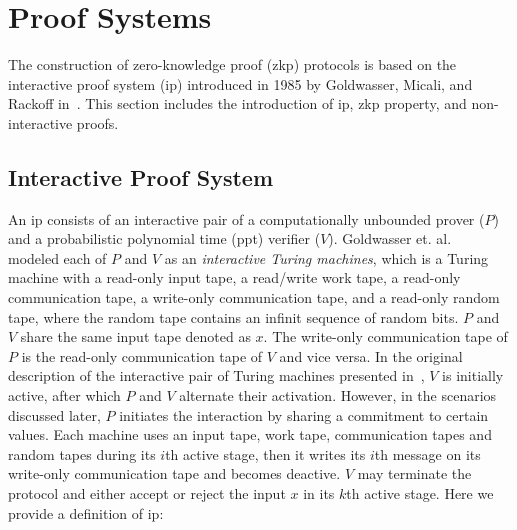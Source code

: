 \section{Proof Systems}

The construction of zero-knowledge proof (\gls{zkp}) protocols is based on the interactive proof system (\gls{ip}) introduced in 1985 by Goldwasser, Micali, and Rackoff in~\cite{Goldwasser1985}.  This section includes the introduction of \gls{ip}, \gls{zkp} property, and non-interactive proofs. 

\subsection{Interactive Proof System}\label{sec:Prel_IP}

 An \gls{ip} consists of  an interactive pair of a computationally unbounded prover ($P$) and a probabilistic polynomial time (\gls{ppt})  verifier ($V$).  Goldwasser et. al.~\cite{Goldwasser1985} modeled each of $P$ and $V$ as an \textit{interactive Turing machines}, which is a Turing machine with a read-only input tape, a read/write work tape, a read-only communication tape, a write-only communication tape, and a read-only random tape, where the random tape contains an infinit sequence of random bits. $P$  and $V$ share the same input tape denoted as $x$. The write-only communication tape of $P$ is the read-only communication tape of $V$ and vice versa. In the original description of the interactive pair of Turing machines presented in~\cite{Goldwasser1985}, $V$ is initially active, after which $P$ and $V$ alternate their activation. However, in the scenarios discussed later, $P$ initiates the interaction by sharing a commitment to certain values. Each machine uses an input tape, work tape, communication tapes and random tapes during its $i$th active stage, then it writes its $i$th message on its write-only communication tape and becomes deactive. $V$ may terminate the protocol and either accept or reject the input $x$ in its $k$th active stage. Here we provide a definition of \gls{ip}:
  

